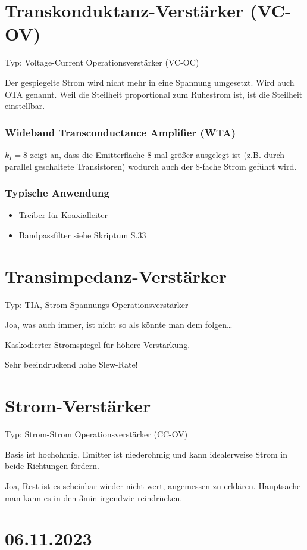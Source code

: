 \documentclass[a5paper]{article}
\begin{document}
\section*{Transkonduktanz-Verstärker (VC-OV)}
Typ: Voltage-Current Operationsverstärker (VC-OC)

Der gespiegelte Strom wird nicht mehr in eine Spannung umgesetzt.
Wird auch OTA genannt. Weil die Steilheit proportional zum Ruhestrom ist, ist 
die Steilheit einstellbar.

\subsubsection*{Wideband Transconductance Amplifier (WTA)}
$k_{I}=8$ zeigt an, dass die Emitterfläche 8-mal größer ausgelegt ist (z.B.
durch parallel geschaltete Transistoren) wodurch auch der 8-fache Strom geführt
 wird.

\subsubsection*{Typische Anwendung}
\begin{itemize}
    \item Treiber für Koaxialleiter
    \item Bandpassfilter
        siehe Skriptum S.33
\end{itemize}

\section*{Transimpedanz-Verstärker}
Typ: TIA, Strom-Spannungs Operationsverstärker

Joa, was auch immer, ist nicht so als könnte man dem folgen\ldots

Kaskodierter Stromspiegel für höhere Verstärkung.

Sehr beeindruckend hohe Slew-Rate!

\section*{Strom-Verstärker}
Typ: Strom-Strom Operationsverstärker (CC-OV)

Basis ist hochohmig, Emitter ist niederohmig und kann idealerweise Strom in
beide Richtungen fördern.

Joa, Rest ist es scheinbar wieder nicht wert, angemessen zu erklären.
Hauptsache man kann es in den 3min irgendwie reindrücken.


\section*{06.11.2023}
\end{document}
